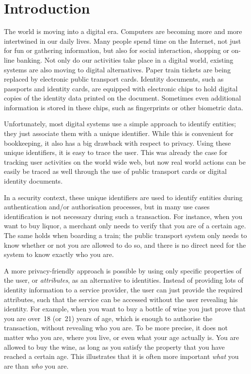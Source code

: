 \chapter{Introduction}

The world is moving into a digital era. Computers are becoming more and more
intertwined in our daily lives. Many people spend time on the Internet, not just
for fun or gathering information, but also for social interaction, shopping or
on-line banking. Not only do our activities take place in a digital world,
existing systems are also moving to digital alternatives. Paper train tickets
are being replaced by electronic public transport cards. Identity documents,
such as passports and identity cards, are equipped with electronic chips to hold
digital copies of the identity data printed on the document. Sometimes even
additional information is stored in these chips, such as fingerprints or other
biometric data.

Unfortunately, most digital systems use a simple approach to identify entities;
they just associate them with a unique identifier. While this is convenient for
bookkeeping, it also has a big drawback with respect to privacy. Using these
unique identifiers, it is easy to trace the user. This was already the case for
tracking user activities on the world wide web, but now real world actions can
be easily be traced as well through the use of public transport cards or digital
identity documents.

In a security context, these unique identifiers are used to identify entities
during authentication and/or authorisation processes, but in many use cases
identification is not necessary during such a transaction. For instance, when
you want to buy liquor, a merchant only needs to verify that you are of a
certain age. The same holds when boarding a train; the public transport system
only needs to know whether or not you are allowed to do so, and there is no
direct need for the system to know exactly who you are.

A more privacy-friendly approach is possible by using only specific properties
of the user, or \emph{attributes}, as an alternative to
identities. Instead of providing lots of identity information to a service
provider, the user can just provide the required attributes, such that the
service can be accessed without the user revealing his identity. For example,
when you want to buy a bottle of wine you just prove that you are over~18
(or~21) years of age, which is enough to authorise the transaction, without
revealing who you are. To be more precise, it does not matter who you are, where
you live, or even what your age actually is. You are allowed to buy the wine, as
long as you satisfy the property that you have reached a certain age. This
illustrates that it is often more important \emph{what} you are than \emph{who}
you are.

